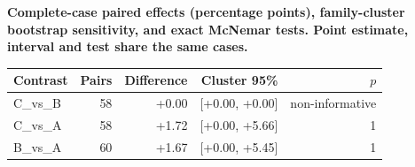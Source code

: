 \begin{center}\begin{minipage}{\linewidth}\centering
\textbf{Complete-case paired effects (percentage points), family-cluster bootstrap sensitivity, and exact McNemar tests. Point estimate, interval and test share the same cases.}\par\vspace{3pt}
\small
\begin{tabular}{lrrrr}
\toprule
Contrast & Pairs & Difference & Cluster 95\% & $p$ \\
\midrule
C\_vs\_B & 58 & +0.00 & [+0.00, +0.00] & non-informative \\
C\_vs\_A & 58 & +1.72 & [+0.00, +5.66] & 1 \\
B\_vs\_A & 60 & +1.67 & [+0.00, +5.45] & 1 \\
\bottomrule
\end{tabular}
\end{minipage}\end{center}
